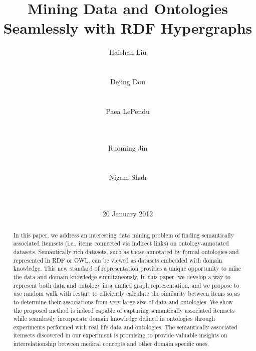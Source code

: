 \documentclass{acm_proc_article-sp}
\begin{document}
\title{Mining Data and Ontologies Seamlessly with RDF Hypergraphs}

\author{
\alignauthor
Haishan Liu\\
       \\
       \\
\alignauthor Dejing Dou\\
       \\
       \\
\alignauthor Paea LePendu\\
       \\
       \\
\and  %
\alignauthor Ruoming Jin\\
       \\
       \\
\alignauthor Nigam Shah\\
       \\
       \\
}
\date{20 January 2012}

\maketitle
\begin{abstract}
In this paper, we address an interesting data mining problem of finding semantically associated itemsets (i.e., items connected via indirect links) on ontology-annotated datasets. Semantically rich datasets, such as those annotated by formal ontologies and represented in RDF or OWL, can be viewed as datasets embedded with domain knowledge. This new standard of representation provides a unique opportunity to mine the data and domain knowledge simultaneously. In this paper, we develop a way to represent both data and ontology in a unified graph representation, and we propose to use random walk with restart to efficiently calculate the similarity between items so as to determine their associations from very large size of data and ontologies.
We show the proposed method is indeed capable of capturing semantically associated itemsets while seamlessly incorporate domain knowledge defined in ontologies through experiments performed with real life data and ontologies. The semantically associated itemsets discovered in our experiment is promising to provide valuable insights on interrelationship between medical concepts and other domain specific ones.

\end{abstract}
\end{document}

